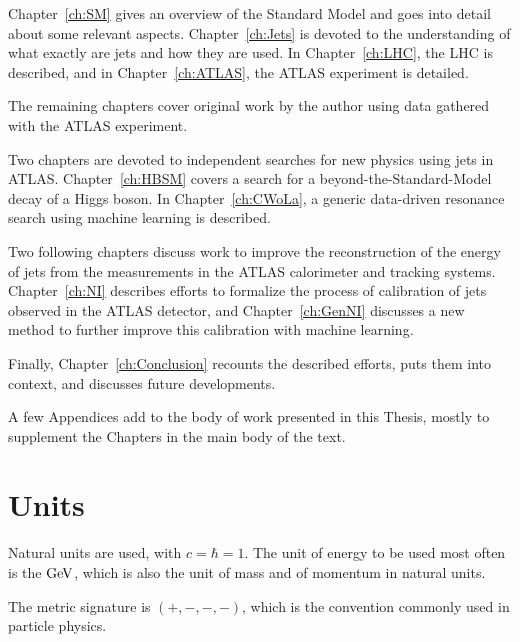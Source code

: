Chapter~\ref{ch:SM} gives an overview of the Standard Model and goes into detail about some relevant aspects.
Chapter~\ref{ch:Jets} is devoted to the understanding of what exactly are jets and how they are used.
In Chapter~\ref{ch:LHC}, the LHC is described, and in Chapter~\ref{ch:ATLAS}, the ATLAS experiment is detailed.

The remaining chapters cover original work by the author using data gathered with the ATLAS experiment.

Two chapters are devoted to independent searches for new physics using jets in ATLAS.
Chapter~\ref{ch:HBSM} covers a search for a beyond-the-Standard-Model decay of a Higgs boson.
In Chapter~\ref{ch:CWoLa}, a generic data-driven resonance search using machine learning is described.

Two following chapters discuss work to improve the reconstruction of the energy of jets from the measurements in the ATLAS calorimeter and tracking systems.
Chapter~\ref{ch:NI} describes efforts to formalize the process of calibration of jets observed in the ATLAS detector, and Chapter~\ref{ch:GenNI} discusses a new method to further improve this calibration with machine learning.

Finally, Chapter~\ref{ch:Conclusion} recounts the described efforts, puts them into context, and discusses future developments.

A few Appendices add to the body of work presented in this Thesis, mostly to supplement the Chapters in the main body of the text.

\section{Units}
Natural units are used, with $c=\hbar=1$.
The unit of energy to be used most often is the $\mathrm{GeV}$, which is also the unit of mass and of momentum in natural units.

The metric signature is $(+,-,-,-)$, which is the convention commonly used in particle physics.

